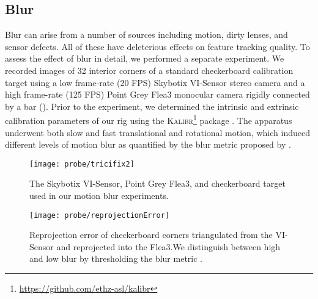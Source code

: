 \subsection{Blur}
Blur can arise from a number of sources including motion, dirty lenses, and sensor defects.
All of these have deleterious effects on feature tracking quality.
To assess the effect of blur in detail, we performed a separate experiment.
We recorded images of 32 interior corners of a standard checkerboard calibration target using a low frame-rate (20 FPS) Skybotix VI-Sensor stereo camera and a high frame-rate (125 FPS) Point Grey Flea3 monocular camera rigidly connected by a bar ().
Prior to the experiment, we determined the intrinsic and extrinsic calibration parameters of our rig using the \textsc{Kalibr}\footnote{\url{https://github.com/ethz-asl/kalibr}} package \cite{Furgale2013-sl}.
The apparatus underwent both slow and fast translational and rotational motion, which induced different levels of motion blur as quantified by the blur metric proposed by \cite{crete2007blur}.

\begin{figure}
    \centering
    \texttt{[image: probe/tricifix2]}
    \caption{The Skybotix VI-Sensor, Point Grey Flea3, and checkerboard target used in our motion blur experiments.}
    \label{fig:probe_tricifix}
\end{figure}



\begin{figure}
    \centering
        \texttt{[image: probe/reprojectionError]}
        \label{fig:probe_visensor_reprojectionError}
      \caption{Reprojection error of checkerboard corners triangulated from the VI-Sensor and reprojected into the Flea3.We distinguish between high and low blur by thresholding the blur metric \cite{crete2007blur}.}
\end{figure}

